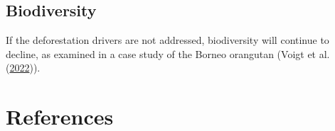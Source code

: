 \documentclass[
  letterpaper,
  DIV=11,
  numbers=noendperiod]{scrreprt}
\begin{document}
\hypertarget{biodiversity}{%
\section{Biodiversity}\label{biodiversity}}

If the deforestation drivers are not addressed, biodiversity will
continue to decline, as examined in a case study of the Borneo orangutan
(Voigt et al.
(\protect\hyperlink{ref-voigtDeforestationProjectionsImply2022}{2022})).


\hypertarget{references}{%
\chapter{References}\label{references}}
\end{document}

